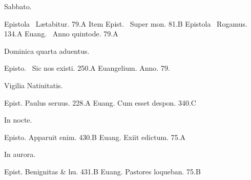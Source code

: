 \documentclass[a5paper,10pt]{book}
\def\ae{æ}
\begin{document}
\begin{multicols}{2}
\begin{center}
\color{red} Sabbato.
\end{center}
\vspace{-.75em}
\par \noindent Epistola \textdagger \ L\ae tabitur. \hfill 79.A
\newline Item Epist. \textdagger \ Super mon. \hfill 81.B
\newline Epistola \textdagger \ Rogamus. \hfill 134.A
\newline Euang. \textdagger \ Anno quintode. \hfill 79.A
\newline \vspace{-1.75em}
\begin{center}
\color{red} Dominica quarta aduentus.
\end{center}
\vspace{-.75em}
\par \noindent Episto. \textdagger \ Sic nos existi. \hfill 250.A
\newline Euangelium. Anno. \hfill 79.
\newline \vspace{-1.75em}
\begin{center}
\color{red} Vigilia Natiuitatis.
\end{center}
\vspace{-.75em}
\par \noindent Epist. Paulus seruus. \hfill 228.A
\newline Euang. Cum esset despon. \hfill 340.C
\newline \vspace{-1.75em}
\begin{center}
\color{red} In nocte.
\end{center}
\vspace{-.75em}
\par \noindent Episto. Apparuit enim. \hfill 430.B
\newline Euang. Exiit edictum. \hfill 75.A
\newline \vspace{-1.75em}
\begin{center}
\color{red} In aurora.
\end{center}
\vspace{-.75em}
\par \noindent Epist. Benignitas \& hu. \hfill 431.B
\newline Euang. Pastores loqueban. \hfill 75.B
\newline \vspace{-1.75em}
\begin{center}

\end{center}
\end{multicols}
\end{document}
